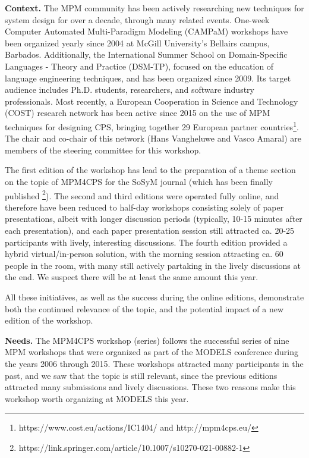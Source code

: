 \smallskip
\noindent
\textbf{Context.}
%
The MPM community has been actively researching new techniques for system design 
for over a decade, through many related events.
One-week Computer Automated Multi-Paradigm Modeling (CAMPaM) workshops have been 
organized yearly since 2004 at McGill University’s Bellairs campus, Barbados. 
Additionally, the International Summer School on Domain-Specific Languages - 
Theory and Practice (DSM-TP), focused on the education of language engineering 
techniques, and has been organized since 2009.
Its target audience includes Ph.D. students, researchers, and software industry 
professionals.
Most recently, a European Cooperation in Science and Technology (COST) research 
network has been active since 2015 on the use of MPM techniques for designing 
CPS, bringing together 29 European partner countries\footnote{https://www.cost.eu/actions/IC1404/ 
and http://mpm4cps.eu/}.
The chair and co-chair of this network (Hans Vangheluwe and Vasco Amaral) are 
members of the steering committee for this workshop.

The first edition of the workshop has lead to the preparation of a theme section
on the topic of MPM4CPS for the SoSyM journal (which has been finally published%
\footnote{ https://link.springer.com/article/10.1007/s10270-021-00882-1}).
The second and third editions were operated fully online, and therefore have been
reduced to half-day workshops consisting solely of paper presentations, albeit with
longer discussion periods (typically, 10-15 minutes after each presentation), and
each paper presentation session still attracted ca. 20-25 participants with lively,
interesting discussions. The fourth edition provided a hybrid virtual/in-person solution,
with the morning session attracting ca. 60 people in the room, with many still 
actively partaking in the lively discussions at the end. We suspect there will 
be at least the same amount this year.

All these initiatives, as well as the success during the online editions, 
demonstrate both the continued relevance of the topic, and the 
potential impact of a new edition of the workshop.




\smallskip
\noindent
\textbf{Needs.}
%
The MPM4CPS workshop (series) follows the successful series of nine MPM workshops that 
were organized as part of the MODELS conference during the years 2006 through 2015.
These workshops attracted many participants in the past, and we saw that the topic
is still relevant, since the previous editions attracted many submissions and lively discussions.
These two reasons make this workshop worth organizing at MODELS this year.

